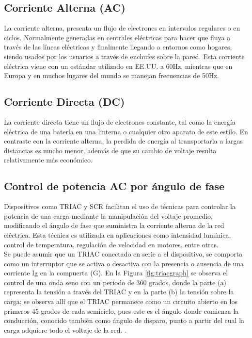 \subsection{Corriente Alterna (AC)}

La corriente alterna, presenta un flujo de electrones en intervalos regulares o en ciclos. Normalmente generadas en centrales eléctricas para hacer que fluya a través de las líneas eléctricas y finalmente llegando a entornos como hogares, siendo usados por los usuarios a través de enchufes sobre la pared. Esta corriente eléctrica viene con un estándar utilizado en EE.UU. a 60Hz, mientras que en Europa y en muchos lugares del mundo se manejan frecuencias de 50Hz.\cite{TC}\\

\subsection{Corriente Directa (DC)}

La corriente directa tiene un flujo de electrones constante, tal como la energía eléctrica de una batería en una linterna o cualquier otro aparato de este estilo. En contraste con la corriente alterna, la perdida de energía al transportarla a largas distancias es mucho menor, además de que su cambio de voltaje resulta relativamente más económico. \cite{TC}\\

\subsection{Control de potencia AC por ángulo de fase}

Dispositivos como TRIAC y SCR facilitan el uso de técnicas para controlar la potencia de una carga mediante la manipulación del voltaje promedio, modificando el ángulo de fase que suministra la corriente alterna de la red eléctrica. Esta técnica es utilizada en aplicaciones como intensidad lumínica, control de temperatura, regulación de velocidad en motores, entre otras.\cite{CEKIT}\\

Se puede asumir que un TRIAC conectado en serie a el dispositivo, se comporta como un interruptor que se activa o desactiva con la presencia o ausencia de una corriente Ig en la compuerta (G). En la Figura \ref{fig:triacgraph} se observa el control de una onda seno con un periodo de 360 grados, donde la parte (a) representa la tensión a través del TRIAC y en la parte (b) la tensión sobre la carga; se observa allí que el TRIAC permanece como un circuito abierto en los primeros 45 grados de cada semiciclo, pues este es el ángulo donde comienza la conducción, conocido también como ángulo de disparo, punto a partir del cual la carga adquiere todo el voltaje de la red. \cite{CEKIT}.\\


